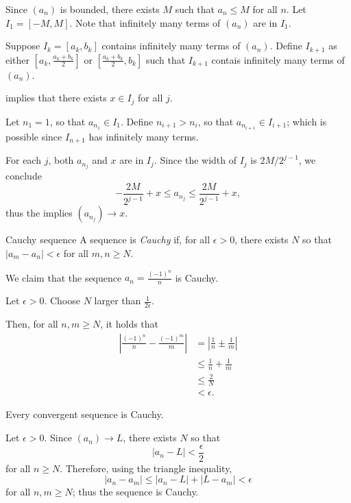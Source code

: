 \begin{dem}{}{}
	Since \((a_n)\) is bounded, there exists \(M\) such that \(a_n \leq M\) for all \(n\). Let \(I_1 = [-M, M]\). Note that infinitely many terms of \((a_n)\) are in \(I_1\).

	Suppose \(I_k = [a_k, b_k]\) contains infinitely many terms of \((a_n)\). Define \(I_{k+1}\) as either \([a_k, \frac{a_k + b_k}{2}]\) or  \([\frac{a_k+b_k}{2}, b_k]\) such that \(I_{k+1}\) contais infinitely many terms of \((a_n)\).

	 implies that there exists \(x \in I_j\) for all \(j\).

	Let \(n_1 = 1\), so that \(a_{n_1} \in I_1\). Define \(n_{i+1} > n_i\), so that \(a_{n_{i+1}} \in I_{i+1}\); which is possible since \(I_{n+1}\) has infinitely many terms.

	For each \(j\), both \(a_{n_j}\) and \(x\) are in \(I_j\). Since the width of \(I_j\) is \(2M/2^{j-1}\), we conclude  \[
		-\frac{2M}{2^{j-1}} + x \leq a_{n_j}  \leq \frac{2M}{2^{j-1}} + x,
	\]
	thus the  implies \((a_{n_j}) \to x\).
\end{dem}

\begin{defn}{Cauchy sequence}{}	
	A sequence is \emph{Cauchy} if, for all \(\epsilon > 0\), there exists \(N\) so that \(|a_m - a_n| < \epsilon\) for all \(m, n \geq N\).
\end{defn}

\begin{exmp}{}{}
	We claim that the sequence \(a_n = \frac{(-1)^n}{n}\) is Cauchy.

	Let \(\epsilon > 0\). Choose \(N\) larger than \(\frac{1}{2\epsilon}\).

	Then, for all \(n, m \geq N\), it holds that
	\begin{align*}
		\left|\frac{(-1)^n}{n} - \frac{(-1)^m}{m}\right| &= \left|\frac{1}{n} \pm \frac{1}{m}\right| \\
		&\leq \frac{1}{n} + \frac{1}{m} \\
		&\leq \frac{2}{N} \\
		&< \epsilon.
	\end{align*}
\end{exmp}

\begin{prop}{}{}
	Every convergent sequence is Cauchy.
\end{prop}

\begin{dem}{}{}
	Let \(\epsilon > 0\). Since \((a_n) \to L\), there exists \(N\) so that  \[
		|a_n - L| < \frac{\epsilon}{2}
	\]
	for all \(n \geq N\). Therefore, using the triangle inequality, \[
		|a_n - a_m| \leq |a_n - L| + |L - a_m| < \epsilon
	\]
	for all \(n, m \geq N\); thus the sequence is Cauchy.
\end{dem}
